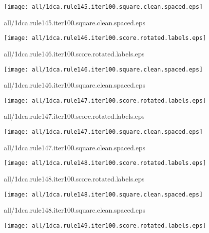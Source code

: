 \documentclass{article}
\begin{document}
\begin{center}
\begin{minipage}{\textwidth}
\texttt{[image: all/1dca.rule145.iter100.square.clean.spaced.eps]}
\end{minipage}
\end{center}
{\footnotesize all/1dca.rule145.iter100.square.clean.spaced.eps}
\begin{center}
\begin{minipage}{\textwidth}
\texttt{[image: all/1dca.rule146.iter100.score.rotated.labels.eps]}
\end{minipage}
\end{center}
{\footnotesize all/1dca.rule146.iter100.score.rotated.labels.eps}
\begin{center}
\begin{minipage}{\textwidth}
\texttt{[image: all/1dca.rule146.iter100.square.clean.spaced.eps]}
\end{minipage}
\end{center}
{\footnotesize all/1dca.rule146.iter100.square.clean.spaced.eps}
\begin{center}
\begin{minipage}{\textwidth}
\texttt{[image: all/1dca.rule147.iter100.score.rotated.labels.eps]}
\end{minipage}
\end{center}
{\footnotesize all/1dca.rule147.iter100.score.rotated.labels.eps}
\begin{center}
\begin{minipage}{\textwidth}
\texttt{[image: all/1dca.rule147.iter100.square.clean.spaced.eps]}
\end{minipage}
\end{center}
{\footnotesize all/1dca.rule147.iter100.square.clean.spaced.eps}
\begin{center}
\begin{minipage}{\textwidth}
\texttt{[image: all/1dca.rule148.iter100.score.rotated.labels.eps]}
\end{minipage}
\end{center}
{\footnotesize all/1dca.rule148.iter100.score.rotated.labels.eps}
\begin{center}
\begin{minipage}{\textwidth}
\texttt{[image: all/1dca.rule148.iter100.square.clean.spaced.eps]}
\end{minipage}
\end{center}
{\footnotesize all/1dca.rule148.iter100.square.clean.spaced.eps}
\begin{center}
\begin{minipage}{\textwidth}
\texttt{[image: all/1dca.rule149.iter100.score.rotated.labels.eps]}
\end{minipage}
\end{center}
\end{document}
